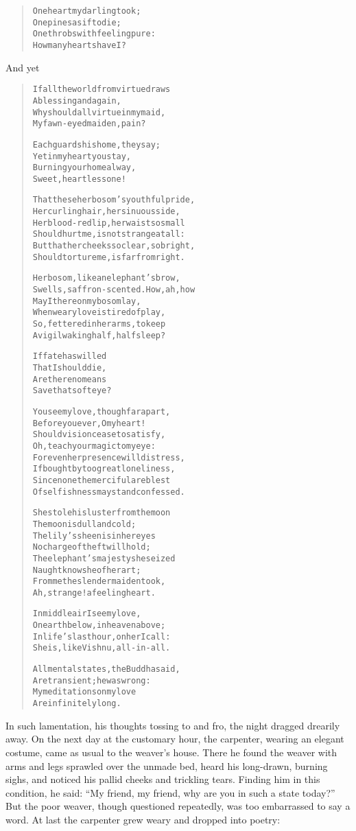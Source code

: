 \documentclass[article, twoside, 14pt]{memoir}
\renewenvironment{verbatim}{%
\begin{quote}%
\vskip -10pt%
\begin{alltt}\normalfont\large}{\end{alltt}%
\end{quote}%
\vskip -10pt
} %
\begin{document}
\begin{verbatim}
One heart my darling took;
    One pines as if to die;
One throbs with feeling pure:
    How many hearts have I?
\end{verbatim}
And yet

\begin{verbatim}
If all the world from virtue draws
    A blessing and a gain,
Why should all virtue in my maid,
    My fawn-eyed maiden, pain?

Each guards his home, they say;
Yet in my heart you stay,
Burning your home alway,
Sweet, heartless one!

That these{\textemdash}her bosom's youthful pride,
Her curling hair, her sinuous side,
Her blood-red lip, her waist so small{\textemdash}
Should hurt me, is not strange at all:
But that her cheeks so clear, so bright,
Should torture me, is far from right.

Her bosom, like an elephant's brow,
Swells, saffron-scented. How, ah, how
May I thereon my bosom lay,
When weary love is tired of play,
So, fettered in her arms, to keep
A vigil waking half, half sleep?

If fate has willed
    That I should die,
Are there no means
    Save that soft eye?

You see my love, though far apart,
Before you ever, O my heart!
Should vision cease to satisfy,
Oh, teach your magic to my eye:
For even her presence will distress,
If bought by too great loneliness,
Since none{\textemdash}the merciful are blest{\textemdash}
Of selfishness may stand confessed.

She stole his luster from the moon{\textemdash}
    The moon is dull and cold;
The lily's sheen is in her eyes{\textemdash}
    No charge of theft will hold;
The elephant's majesty she seized{\textemdash}
    Naught knows he of her art;
From me the slender maiden took,
    Ah, strange! a feeling heart.

In middle air I see my love,
On earth below, in heaven above;
In life's last hour, on her I call:
She is, like Vishnu, all-in-all.

All mental states, the Buddha said,
    Are transient; he was wrong:
My meditations on my love
    Are infinitely long.
\end{verbatim}
In such lamentation, his thoughts tossing to and fro, the night
dragged drearily away. On the next day at the customary hour, the
carpenter, wearing an elegant costume, came as usual to the
weaver's house. There he found the weaver with arms and legs
sprawled over the unmade bed, heard his long-drawn, burning sighs,
and noticed his pallid cheeks and trickling tears. Finding him in
this condition, he said:
``My friend, my friend, why are you in such a state today?'' But
the poor weaver, though questioned repeatedly, was too embarrassed
to say a word. At last the carpenter grew weary and dropped into
poetry:
\end{document}
